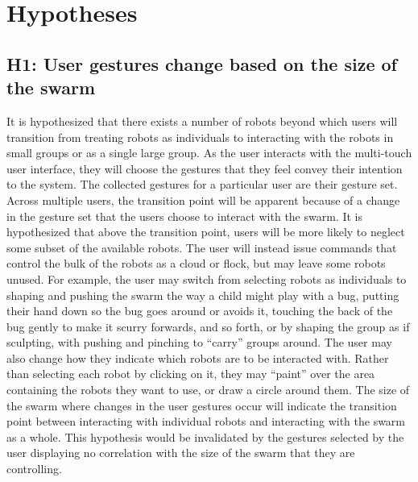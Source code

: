 \section{Hypotheses} \label{section:Hypotheses}

\subsection{H1: User gestures change based on the size of the swarm}

It is hypothesized that there exists a number of robots beyond which users will transition from treating robots as individuals to interacting with the robots in small groups or as a single large group. 
As the user interacts with the multi-touch user interface, they will choose the gestures that they feel convey their intention to the system. 
The collected gestures for a particular user are their gesture set.
Across multiple users, the transition point will be apparent because of a change in the gesture set that the users choose to interact with the swarm. 
It is hypothesized that above the transition point, users will be more likely to neglect some subset of the available robots. 
The user will instead issue commands that control the bulk of the robots as a cloud or flock, but may leave some robots unused. 
For example, the user may switch from selecting robots as individuals to shaping and pushing the swarm the way a child might play with a bug, putting their hand down so the bug goes around or avoids it, touching the back of the bug gently to make it scurry forwards, and so forth, or by shaping the group as if sculpting, with pushing and pinching to ``carry'' groups around. 
The user may also change how they indicate which robots are to be interacted with. 
Rather than selecting each robot by clicking on it, they may ``paint'' over the area containing the robots they want to use, or draw a circle around them. 
The size of the swarm where changes in the user gestures occur will indicate the transition point between interacting with individual robots and interacting with the swarm as a whole. 
This hypothesis would be invalidated by the gestures selected by the user displaying no correlation with the size of the swarm that they are controlling. 


